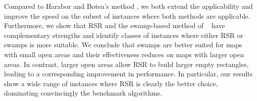 Compared to Harabor and Botea's method \cite{harabor10}, 
we both extend the applicability and improve the speed
on the subset of instances where both methods are applicable.
Furthermore, we show that RSR and the swamp-based method of 
~\cite{pochter10}
have complementary strengths and identify classes of instances where
either RSR or swamps is more suitable.
We conclude that swamps are better suited for maps with
small open areas and their effectiveness reduces on maps with larger open areas.
In contrast, larger open areas allow RSR to build larger empty rectangles,
leading to a corresponding improvement in performance.
In particular, our results show a wide range of instances where
RSR is clearly the better choice, dominating convincingly the benchmark algorithms.

